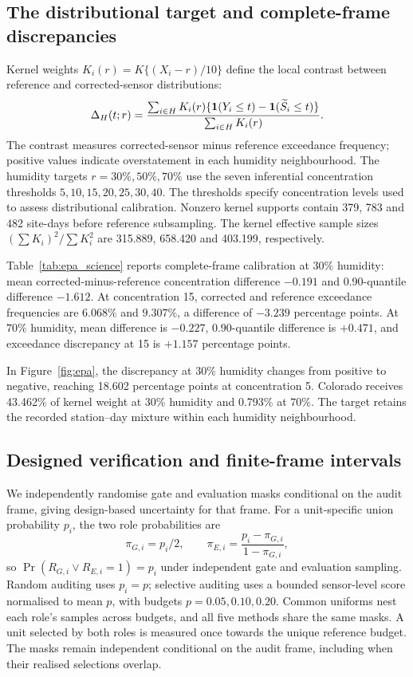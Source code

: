 \subsection{The distributional target and complete-frame discrepancies}
Kernel weights $K_i(r)=K\{(X_i-r)/10\}$ define the local contrast between reference and corrected-sensor distributions:
\begin{equation}\label{eq:epatarget}
 \Delta_H(t;r)=\frac{\sum_{i\in H}K_i(r)
       \{\mathbf 1(Y_i\leq t)-\mathbf 1(\widetilde S_i\leq t)\}}
       {\sum_{i\in H}K_i(r)}.
\end{equation}
The contrast measures corrected-sensor minus reference exceedance frequency; positive values indicate overstatement in each humidity neighbourhood.
The humidity targets $r=30\%,50\%,70\%$ use the seven inferential concentration thresholds $5,10,15,20,25,30,40$.
The thresholds specify concentration levels used to assess distributional calibration.
Nonzero kernel supports contain 379, 783 and 482 site-days before reference subsampling.
The kernel effective sample sizes $(\sum K_i)^2/\sum K_i^2$ are 315.889, 658.420 and 403.199, respectively.

Table~\ref{tab:epa_science} reports complete-frame calibration at $30\%$ humidity: mean corrected-minus-reference concentration difference $-0.191$ and 0.90-quantile difference $-1.612$.
At concentration 15, corrected and reference exceedance frequencies are $6.068\%$ and $9.307\%$, a difference of $-3.239$ percentage points.
At $70\%$ humidity, mean difference is $-0.227$, 0.90-quantile difference is $+0.471$, and exceedance discrepancy at 15 is $+1.157$ percentage points.

In Figure~\ref{fig:epa}, the discrepancy at $30\%$ humidity changes from positive to negative, reaching 18.602 percentage points at concentration 5.
Colorado receives 43.462\% of kernel weight at $30\%$ humidity and 0.793\% at $70\%$.
The target retains the recorded station--day mixture within each humidity neighbourhood.



\subsection{Designed verification and finite-frame intervals}
We independently randomise gate and evaluation masks conditional on the audit frame, giving design-based uncertainty for that frame.
For a unit-specific union probability $p_i$, the two role probabilities are
\begin{equation}\label{eq:twomasks}
 \pi_{G,i}=p_i/2,\qquad
 \pi_{E,i}=\frac{p_i-\pi_{G,i}}{1-\pi_{G,i}},
\end{equation}
so $\Pr(R_{G,i}\vee R_{E,i}=1)=p_i$ under independent gate and evaluation sampling.
Random auditing uses $p_i=p$; selective auditing uses a bounded sensor-level score normalised to mean $p$, with budgets $p=0.05,0.10,0.20$.
Common uniforms nest each role's samples across budgets, and all five methods share the same masks.
A unit selected by both roles is measured once towards the unique reference budget.
The masks remain independent conditional on the audit frame, including when their realised selections overlap.

